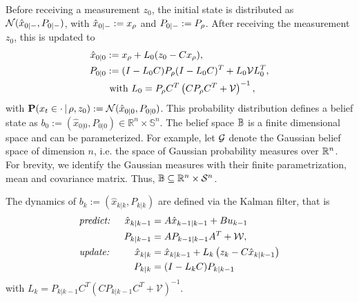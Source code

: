 \documentclass{ifacconf}
\begin{document}
 
Before receiving a measurement $z_0$, the initial state is distributed  as $\mathcal{N}(\hat x_{0|-}, P_{0|-})$, with $\hat x_{0|-}:= x_\rho$ and $P_{0|-}:= P_{\rho}$.
After receiving the measurement $z_0$, this is updated to \begin{align*}
	\hat x_{0|0}&:= x_\rho+ L_0 (z_0-Cx_\rho),\\
	P_{0|0}&:=(I-L_0 C) P_{\rho}(I-L_0 C)^T+L_0\mathcal{V} L_0^T,\\
	& \mbox{ with } L_0=P_{\rho}C^T\left(CP_{\rho}C^T+\mathcal V\right)^{-1},
\end{align*}
with $\mathbf{P}(x_t\in \cdot\,|\,\rho,z_0):=\mathcal{N}(\hat x_{0|0}, P_{0|0})$.
This probability distribution defines a belief state as $b_0:=(\hat x_{0|0}, P_{0|0})\in\mathbb R^n\times \mathbb S^n$. The belief space $\mathbb{B}$ is  a finite dimensional space and can be parameterized. For example, let $\mathcal{G}$ denote the Gaussian belief space
    of dimension $n$, i.e. the space of Gaussian
    probability measures over $\mathbb{R}^n$.
    For brevity, we identify the Gaussian measures
    with their finite parametrization, mean and
    covariance matrix.
     Thus,
    $\mathbb{B} \subseteq  \mathbb{R}^n \times  \mathcal S^n$.


The dynamics of  $b_k:=(\hat x_{k|k}, P_{k|k})$ are defined via the 
 Kalman filter, that is
	\begin{align*}
	&\text{\it predict: }&\hat x_{k|k-1}&=A\hat x_{k-1|k-1}+Bu_{k-1} \\
	&&P_{k|k-1}&=AP_{k-1|k-1}A^T+\mathcal W,
\\
	&\text{\it update: }&\hat x_{k|k}&=\hat x_{k|k-1}+L_k\left(z_k-C \hat x_{k|k-1}\right)\\
	&&P_{k|k}&=(I-L_kC)P_{k|k-1}
	\end{align*}
	with  $L_{k}=P_{k|k-1}C^T\left(CP_{k|k-1}C^T+\mathcal V\right)^{-1}$.
 
\end{document}
